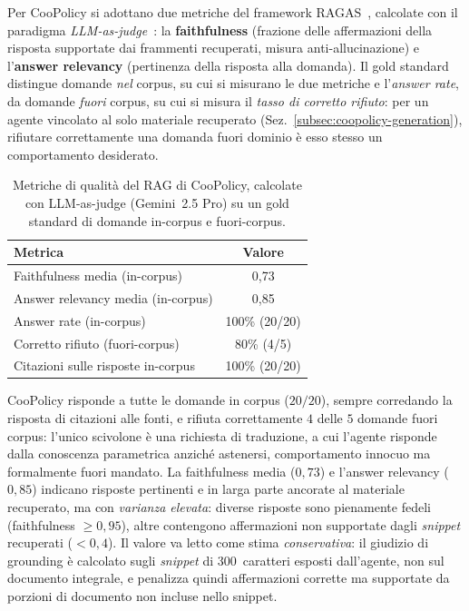 Per CooPolicy si adottano due metriche del framework RAGAS~\cite{es2023ragas}, calcolate con il paradigma \emph{LLM-as-judge}~\cite{zheng2023llmjudge}: 
la \textbf{faithfulness} (frazione delle affermazioni della risposta supportate dai frammenti recuperati, misura anti-allucinazione) e l'\textbf{answer relevancy} 
(pertinenza della risposta alla domanda). Il gold standard distingue domande \emph{nel} corpus, su cui si misurano le due metriche e l'\emph{answer rate}, 
da domande \emph{fuori} corpus, su cui si misura il \emph{tasso di corretto rifiuto}: per un agente vincolato al solo materiale recuperato (Sez.~\ref{subsec:coopolicy-generation}), 
rifiutare correttamente una domanda fuori dominio è esso stesso un comportamento desiderato.

\begin{table}[htbp]
  \centering
  \caption[Metriche RAG di CooPolicy]{Metriche di qualità del RAG di CooPolicy, calcolate con LLM-as-judge (Gemini~2.5 Pro) su un gold standard di domande in-corpus e fuori-corpus.}
  \label{tab:eval-rag}
  \begin{tabular}{lc}
    \toprule
    \textbf{Metrica} & \textbf{Valore} \\
    \midrule
    Faithfulness media (in-corpus)              & 0{,}73 \\
    Answer relevancy media (in-corpus)          & 0{,}85 \\
    Answer rate (in-corpus)                     & 100\% (20/20) \\
    Corretto rifiuto (fuori-corpus)             & 80\% (4/5) \\
    Citazioni sulle risposte in-corpus          & 100\% (20/20) \\
    \bottomrule
  \end{tabular}
\end{table}

CooPolicy risponde a tutte le domande in corpus ($20/20$), sempre corredando la risposta di citazioni alle fonti, 
e rifiuta correttamente $4$ delle $5$ domande fuori corpus: l'unico scivolone è una richiesta di traduzione, 
a cui l'agente risponde dalla conoscenza parametrica anziché astenersi, comportamento innocuo ma formalmente fuori mandato. 
La faithfulness media ($0{,}73$) e l'answer relevancy ($0{,}85$) indicano risposte pertinenti e in larga parte ancorate al materiale recuperato, 
ma con \emph{varianza elevata}: diverse risposte sono pienamente fedeli (faithfulness $\geq 0{,}95$), 
altre contengono affermazioni non supportate dagli \emph{snippet} recuperati ($< 0{,}4$). 
Il valore va letto come stima \emph{conservativa}: il giudizio di grounding è calcolato sugli \emph{snippet} di 300~caratteri esposti dall'agente, 
non sul documento integrale, e penalizza quindi affermazioni corrette ma supportate da porzioni di documento non incluse nello snippet.

